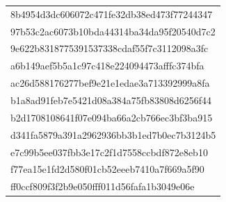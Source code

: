 \begin{tabular}{l}
8b4954d3dc606072c471fe32db38ed473f77244347 \\
97b53c2ac6073b10bda44314ba34da95f20540d7c2 \\
9e622b8318775391537338cdaf55f7c3112098a3fc \\
a6b149aef5b5a1c97c418e224094473afffc374bfa \\
ac26d588176277bef9e21e1edae3a713392999a8fa \\
b1a8ad91feb7e5421d08a384a75fb83808d6256f44 \\
b2d1708108641f07e094ba66a2cb766ec3bf3ba915 \\
d341fa5879a391a2962936bb3b1ed7b0ec7b3124b5 \\
e7c99b5ee037fbb3e17c2f1d7558ccbdf872e8eb10 \\
f77ea15e1fd2d580f01cb52eeeb7410a7f669a5f90 \\
ff0ccf809f3f2b9e050fff011d56fafa1b3049e06e \\
\bottomrule
\end{tabular}
